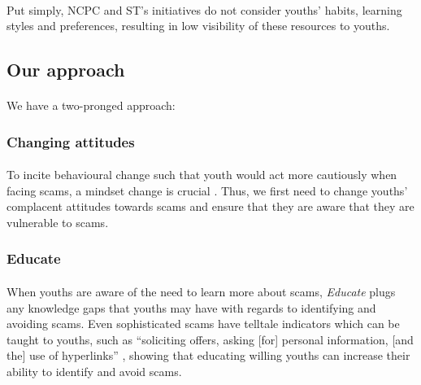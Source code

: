 \message{ !name(written-report.tex)}\documentclass[a4paper]{article}
\begin{document}
\paragraph{} Put simply, NCPC and ST's initiatives do not consider youths'
habits, learning styles and preferences, resulting in low visibility of these
resources to youths.

\subsection{Our approach}
\paragraph{} We have a two-pronged approach:

\subsubsection{Changing attitudes}
\paragraph{} To incite behavioural change such that youth would act more
cautiously when facing scams, a mindset change is crucial
\parencite{ConnorBernal.2020}. Thus, we first need to change youths’ complacent
attitudes towards scams and ensure that they are aware that they are vulnerable
to scams.

\subsubsection{Educate}
\paragraph{} When youths are aware of the need to learn more about scams,
\emph{Educate} plugs any knowledge gaps that youths may have with regards to
identifying and avoiding scams. Even sophisticated scams have telltale
indicators which can be taught to youths, such as ``soliciting offers, asking
[for] personal information, [and the] use of hyperlinks''
\parencite{DatarColeRogers.2014}, showing that educating willing youths can
increase their ability to identify and avoid scams.

\newpage
\end{document}
